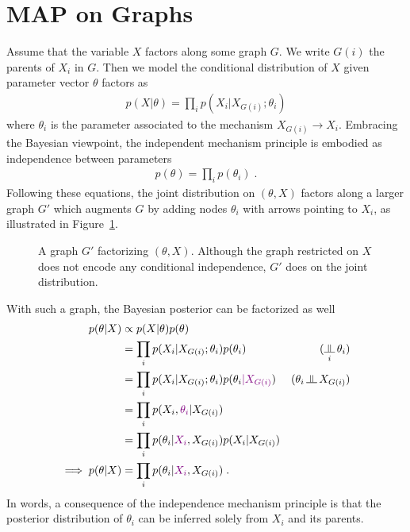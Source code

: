 \documentclass{article}
\newcommand{\natp}{\theta}
\newcommand{\violet}[1]{\textcolor{violet}{#1}}
\begin{document}
\section{MAP on Graphs}
Assume that the variable $X$ factors along some graph $G$. 
We write $G(i)$ the parents of $X_i$ in $G$. 
Then we model the conditional distribution of $X$ given parameter vector $\theta$ factors as
\begin{align}
    p(X|\natp) = \prod_i p(X_i | X_{G(i)};\natp_i)
\end{align}
where $\natp_i$ is the parameter associated to the mechanism $X_{G(i)} \rightarrow X_i$. 
Embracing the Bayesian viewpoint, the independent mechanism principle is embodied as independence between parameters
\begin{align}
    p(\natp) = \prod_i p(\natp_i) \; .
\end{align}
Following these equations, the joint distribution on $(\natp,X)$ factors along a larger graph $G'$ which augments $G$ by adding nodes $\natp_i$ with arrows pointing to $X_i$, as illustrated in Figure~\ref{fig:joint_graph}.
\begin{figure}[ht]
    \centering
    \caption{A graph $G'$ factorizing $(\natp,X)$. Although the graph restricted on $X$ does not encode any conditional independence, $G'$ does on the joint distribution.}
    \label{fig:joint_graph}
\end{figure}
With such a graph, the Bayesian posterior can be factorized as well
\begin{align}
    p(\natp|X) 
    &\propto  p(X|\natp) p(\natp)& \\
    & = \prod_i p(X_i | X_{G(i)};\natp_i) p(\natp_i)
    &(\indep_i \natp_i) \\
    & = \prod_i p(X_i | X_{G(i)};\natp_i) p(\natp_i\violet{|X_{G(i)}})
    &(\natp_i \indep X_{G(i)}) \\
    & = \prod_i p(X_i, \violet{\natp_i} | X_{G(i)})    &  \\
    & = \prod_i p(\natp_i| \violet{X_i}, X_{G(i)})p(X_i|X_{G(i)})    &  \\
    \implies p(\natp|X) 
    &= \prod_i p(\natp_i| \violet{X_i}, X_{G(i)}) \; .
\end{align}
In words, a consequence of the independence mechanism principle is that the posterior distribution of $\natp_i$ can be inferred solely from $X_i$ and its parents. 
\end{document}
